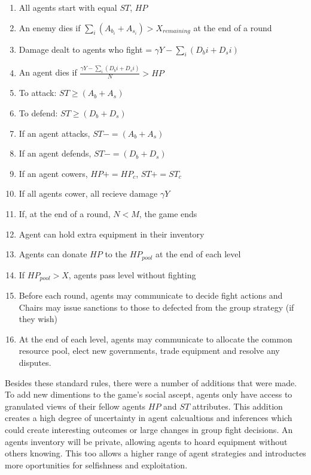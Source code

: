 \begin{enumerate}
    \item All agents start with equal $ST$, $HP$
    \item An enemy dies if $\sum_{i} (A_b_i + A_s_i) > X_{remaining}$ at the end of a round
    \item Damage dealt to agents who fight = $\gamma Y - \sum_{i} (D_bi + D_si)$ 
    \item An agent dies if $\frac{\gamma Y - \sum_{i} (D_bi + D_si)}{N} > HP$
    \item To attack: $ST \geq (A_b + A_s)$
    \item To defend: $ST \geq (D_b + D_s)$
    \item If an agent attacks, $ST -= (A_b + A_s)$
    \item If an agent defends, $ST -= (D_b + D_s)$
    \item If an agent cowers, $HP += HP_c$, $ST += ST_c$
    \item If all agents cower, all recieve damage $\gamma Y$
    \item If, at the end of a round, $N<M$, the game ends 

    \item Agent can hold extra equipment in their inventory
    \item Agents can donate $HP$ to the $HP_{pool}$ at the end of each level
    \item If $HP_{pool} > X$, agents pass level without fighting

    \item Before each round, agents may communicate to decide fight actions and Chairs may issue sanctions to those to defected from the group strategy (if they wish)
    \item At the end of each level, agents may communicate to allocate the common resource pool, elect new governments, trade equipment and resolve any disputes.


\end{enumerate}


Besides these standard rules, there were a number of additions that were made. To add new dimentions to the game's social ascept, agents only have access to granulated views of their fellow agents $HP$ and $ST$ attributes. This addition creates a high degree of uncertainty in agent calcualtions and inferences which could create interesting outcomes or large changes in group fight decisions. An agents inventory will be private, allowing agents to hoard equipment without others knowing. This too allows a higher range of agent strategies and introductes more oportunities for selfishness and exploitation. 

